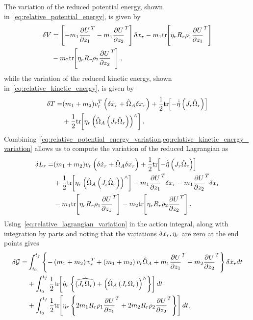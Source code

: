 The variation of the reduced potential energy, shown in~\cref{eq:relative_potential_energy}, is given by
\begin{align}\label{eq:relative_potential_energy_variation}
    \delta V &= \left[ -m_1 \frac{\partial U}{\partial z_1}^T - m_1 \frac{\partial U}{\partial z_2}^T \right] \delta x_r - m_1 \mathrm{tr}\negthickspace\left[  \eta_r R_r \rho_1 \frac{\partial U}{\partial z_1}^T \right] \nonumber\\
             &- m_2 \mathrm{tr}\negthickspace\left[ \eta_r R_r \rho_2 \frac{\partial U}{\partial z_2}^T \right],
\end{align}
while the variation of the reduced kinetic energy, shown in~\cref{eq:relative_kinetic_energy}, is given by
\begin{align}\label{eq:relative_kinetic_energy_variation}
    \delta T =& (m_1 + m_2) v_r^T \left( \delta \dot{x}_r +  \hat{\Omega}_A \delta x_r \right) + \frac{1}{2} \mathrm{tr}\negthickspace\left[  -\dot{\hat{\eta}}\left( J_r  \hat{\Omega}_r  \right) \right] \nonumber\\
             &+\frac{1}{2} \mathrm{tr}\negthickspace\left[ \eta_r \left(  \hat{\Omega}_A\left( J_r  \hat{\Omega}_r \right) \right)^\wedge \right] .
\end{align}
Combining~\cref{eq:relative_potential_energy_variation,eq:relative_kinetic_energy_variation} allows us to compute the variation of the reduced Lagrangian as
\begin{align}\label{eq:relative_lagrangian_variation}
    \delta L_r =& (m_1 + m_2) v_r \left( \delta \dot{x}_r +  \hat{\Omega}_A \delta x_r \right) + \frac{1}{2} \mathrm{tr}\negthickspace\left[  -\dot{\hat{\eta}}\left( J_r  \hat{\Omega}_r  \right) \right] \nonumber\\
    &+\frac{1}{2} \mathrm{tr}\negthickspace\left[ \eta_r \left(  \hat{\Omega}_A\left( J_r  \hat{\Omega}_r \right) \right)^\wedge \right] -m_1 \frac{\partial U}{\partial z_1}^T \delta x_r - m_1 \frac{\partial U}{\partial z_2}^T \delta x_r \nonumber\\
    &- m_1 \mathrm{tr}\negthickspace\left[  \eta_r  R_r \rho_1 \frac{\partial U}{\partial z_1}^T \right] - m_2 \mathrm{tr}\negthickspace\left[ \eta_r  R_r \rho_2 \frac{\partial U}{\partial z_2}^T \right].
\end{align}
Using~\cref{eq:relative_lagrangian_variation} in the action integral, along with integration by parts and noting that the variations \( \delta x_r, \eta_r\) are zero at the end points gives 
\begin{align}\label{eq:relative_hamiltons_principle}
    \delta \mathcal{G} =& \int_{t_0}^{t_f} \left\{-\left( m_1+m_2 \right) \dot{v}_r^T + \left( m_1 + m_2 \right) v_r \hat{\Omega}_A + m_1 \frac{\partial U}{\partial z_1}^T + m_2 \frac{\partial U}{\partial z_2}^T \right\}\delta \dot{x}_r  dt \nonumber\\
                        & +\int_{t_0}^{t_f} \frac{1}{2} \mathrm{tr}\negthickspace\left[ \dot{\eta}_r \left\{ \dot{\widehat{\left( J_r \Omega_r \right)}} + \left( \hat{\Omega}_A \left( J_r \Omega_r \right) \right)^\wedge  \right\} \right] dt \nonumber\\
                        & + \int_{t_0}^{t_f}  \frac{1}{2} \mathrm{tr}\negthickspace\left[ \eta_r  \left\{ 2 m_1R_r \rho_1\frac{\partial U}{\partial z_1}^T + 2 m_2 R_r \rho_2\frac{\partial U}{\partial z_2}^T \right\} \right] dt.
\end{align}
